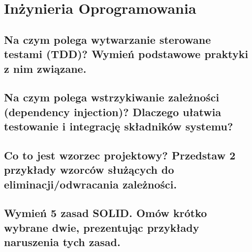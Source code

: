 \chapter{Inżynieria Oprogramowania}

\section{Na czym polega wytwarzanie sterowane testami (TDD)? Wymień podstawowe praktyki z nim związane.}


\section{Na czym polega wstrzykiwanie zależności (dependency injection)? Dlaczego ułatwia testowanie i integrację składników systemu?}


\section{Co to jest wzorzec projektowy? Przedstaw 2 przykłady wzorców służących do eliminacji/odwracania zależności.}


\section{Wymień 5 zasad SOLID. Omów krótko wybrane dwie, prezentując przykłady naruszenia tych zasad.}

